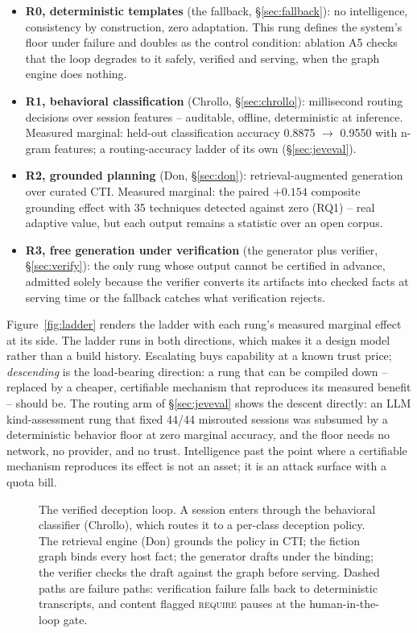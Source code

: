 \begin{itemize}
\item \textbf{R0, deterministic templates} (the fallback,
\S\ref{sec:fallback}): no intelligence, consistency by
construction, zero adaptation. This rung defines the system's floor
under failure and doubles as the control condition: ablation A5 checks that the
loop degrades to it safely, verified and serving, when the graph engine
does nothing.
\item \textbf{R1, behavioral classification} (Chrollo,
\S\ref{sec:chrollo}): millisecond routing decisions over session
features -- auditable, offline, deterministic at inference. Measured
marginal: held-out classification accuracy 0.8875 $\to$ 0.9550 with
n-gram features; a routing-accuracy ladder of its own
(\S\ref{sec:jeveval}).
\item \textbf{R2, grounded planning} (Don, \S\ref{sec:don}):
retrieval-augmented generation over curated CTI. Measured marginal: the
paired $+0.154$ composite grounding effect with 35 techniques detected
against zero (RQ1) -- real adaptive value, but each output remains a
statistic over an open corpus.
\item \textbf{R3, free generation under verification} (the generator
plus verifier, \S\ref{sec:verify}): the only rung whose output cannot be
certified in advance, admitted solely because the verifier converts its
artifacts into checked facts at serving time or the fallback catches
what verification rejects.
\end{itemize}

\noindent Figure~\ref{fig:ladder} renders the ladder with each rung's
measured marginal effect at its side.
The ladder runs in both directions, which makes it a design
model rather than a build history. Escalating buys capability at
a known trust price; \emph{descending} is the load-bearing direction: a
rung that can be compiled down -- replaced by a cheaper, certifiable
mechanism that reproduces its measured benefit -- should be. The routing
arm of \S\ref{sec:jeveval} shows the descent directly: an LLM
kind-assessment rung that fixed 44/44 misrouted sessions was subsumed by
a deterministic behavior floor at zero marginal accuracy, and the floor
needs no network, no provider, and no trust. Intelligence past the point
where a certifiable mechanism reproduces its effect is not an asset; it
is an attack surface with a quota bill.


\begin{figure}[t]
\centering

\caption{The verified deception loop. A session enters through the
behavioral classifier (Chrollo), which routes it to a per-class deception
policy. The retrieval engine (Don) grounds the policy in CTI; the fiction
graph binds every host fact; the generator drafts under the binding; the
verifier checks the draft against the graph before serving. Dashed paths
are failure paths: verification failure falls back to deterministic
transcripts, and content flagged \textsc{require} pauses at the
human-in-the-loop gate.}
\label{fig:architecture}
\end{figure}

